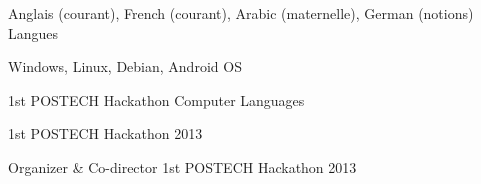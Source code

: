 

\begin{cvhonors}

  \cvhonor
    {} %
    {\hspace{1mm} Anglais (courant), French  (courant), Arabic (maternelle), German (notions) } %
    {} %
    {Langues} %

  \cvhonor
    {} %
    {\hspace{1mm}Windows, Linux, Debian, Android} %
    {} %
    {OS} %


\cvhonor
    {} %
    {\hspace{1mm}1st POSTECH Hackathon} %
    {} %
    {Computer Languages} %

\cvhonor
    {} %
    {\hspace{1mm}1st POSTECH Hackathon} %
    {} %
    {2013} %

\cvhonor
    {Organizer \& Co-director} %
    {\hspace{1mm} 1st POSTECH Hackathon} %
    {} %
    {2013} %




\end{cvhonors}
